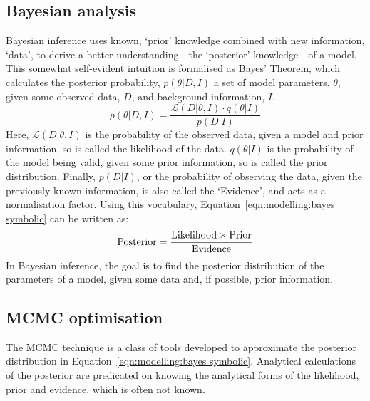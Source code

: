 \subsection{Bayesian analysis}
\label{sect:modelling:Bayesian analysis}
Bayesian inference uses known, `prior' knowledge combined with new information, `data', to derive a better understanding - the `posterior' knowledge - of a model. This somewhat self-evident intuition is formalised as Bayes' Theorem, which calculates the posterior probability, $p(\theta | D, I)$ a set of model parameters, $\theta$, given some observed data, $D$, and background information, $I$.
\begin{equation}
    \label{eqn:modelling:bayes symbolic}
    p(\theta | D,I) = \frac{\mathcal{L}(D | \theta, I) \cdot q(\theta | I)}{p(D|I)}
\end{equation}
Here, $\mathcal{L}(D | \theta, I)$ is the probability of the observed data, given a model and prior information, so is called the likelihood of the data.
$q(\theta|I)$ is the probability of the model being valid, given some prior information, so is called the prior distribution. Finally, $p(D | I)$, or the probability of observing the data, given the previously known information, is also called the `Evidence', and acts as a normalisation factor. Using this vocabulary, Equation~\ref{eqn:modelling:bayes symbolic} can be written as:
\begin{equation}
    \label{eqn:modelling:bayes english}
    \rm Posterior = \frac{Likelihood \times Prior}{Evidence}
\end{equation}
In Bayesian inference, the goal is to find the posterior distribution of the parameters of a model, given some data and, if possible, prior information.


\subsection{MCMC optimisation}
\label{sect:modelling:affine invariant MCMC}
The MCMC technique is a class of tools developed to approximate the posterior distribution in Equation~\ref{eqn:modelling:bayes symbolic}. Analytical calculations of the posterior are predicated on knowing the analytical forms of the likelihood, prior and evidence, which is often not known.

